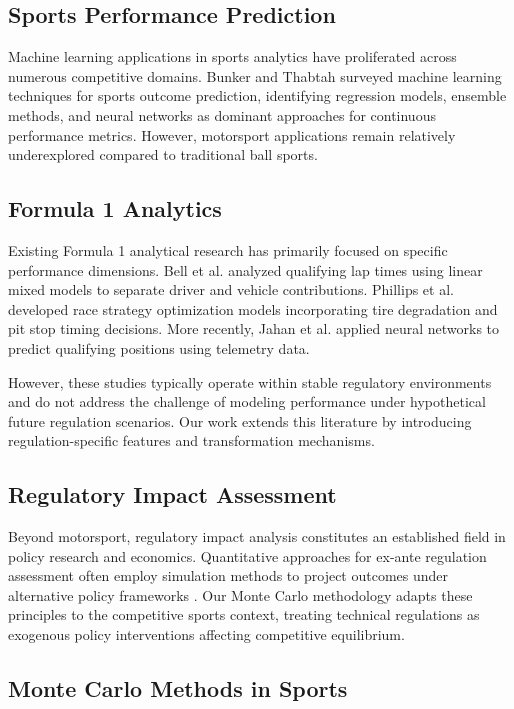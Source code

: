 \documentclass[conference]{IEEEtran}
\begin{document}
\subsection{Sports Performance Prediction}

Machine learning applications in sports analytics have proliferated across numerous competitive domains. Bunker and Thabtah \cite{bunker2019} surveyed machine learning techniques for sports outcome prediction, identifying regression models, ensemble methods, and neural networks as dominant approaches for continuous performance metrics. However, motorsport applications remain relatively underexplored compared to traditional ball sports.

\subsection{Formula 1 Analytics}

Existing Formula 1 analytical research has primarily focused on specific performance dimensions. Bell et al. \cite{bell2016} analyzed qualifying lap times using linear mixed models to separate driver and vehicle contributions. Phillips et al. \cite{phillips2014} developed race strategy optimization models incorporating tire degradation and pit stop timing decisions. More recently, Jahan et al. \cite{jahan2023} applied neural networks to predict qualifying positions using telemetry data.

However, these studies typically operate within stable regulatory environments and do not address the challenge of modeling performance under hypothetical future regulation scenarios. Our work extends this literature by introducing regulation-specific features and transformation mechanisms.

\subsection{Regulatory Impact Assessment}

Beyond motorsport, regulatory impact analysis constitutes an established field in policy research and economics. Quantitative approaches for ex-ante regulation assessment often employ simulation methods to project outcomes under alternative policy frameworks \cite{kirkpatrick2006}. Our Monte Carlo methodology adapts these principles to the competitive sports context, treating technical regulations as exogenous policy interventions affecting competitive equilibrium.

\subsection{Monte Carlo Methods in Sports}
\end{document}

